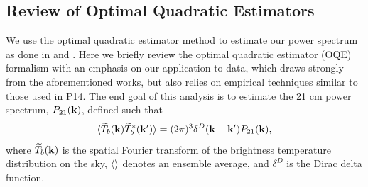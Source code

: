 \documentclass[twocolumn,numberedappendix]{emulateapj} \shorttitle{New Limits on the 21 cm Power Spectrum at $z=8.4$}
\begin{document}
%
%
\subsection{Review of Optimal Quadratic Estimators}
We use the optimal quadratic estimator method to estimate our power spectrum as
done in \citet{liu_tegmark2011} and \citet{dillon_et_al2013a}.  Here we briefly review the
optimal quadratic estimator (OQE) formalism with an emphasis on our application
to data, which draws strongly from the aforementioned works, but also relies on empirical
techniques similar to those used in P14. The end goal of this analysis is to estimate the 21 cm
power spectrum, $P_{21}(\mathbf{k})$, defined such that 
\begin{equation}
\label{eqn:pspec_def}
    \expval{\widetilde{T}_{b}(\k)\widetilde{T}^{*}_{b}(\k^{\prime})} =
            (2\pi)^{3}\delta^{D}(\k - \k^{\prime})P_{21}(\k),
\end{equation}
where $\widetilde{T}_{b}(\mathbf{k})$ is the spatial Fourier transform of the brightness temperature
distribution on the sky, $\langle  \rangle$ denotes an ensemble average, and
$\delta^{D}$ is the Dirac delta function. 
\end{document}
